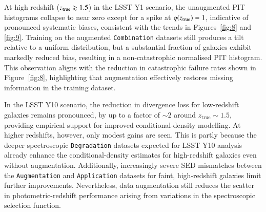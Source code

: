 At high redshift (\(z_{\rm true}\gtrsim1.5\)) in the LSST Y1 scenario, the unaugmented PIT histograms collapse to near zero except for a spike at \(q(z_{\rm true})=1\), indicative of pronounced systematic biases, consistent with the trends in Figures~\ref{fig:8} and \ref{fig:9}. Training on the augmented \texttt{Combination} datasets still produces a tilt relative to a uniform distribution, but a substantial fraction of galaxies exhibit markedly reduced bias, resulting in a non‐catastrophic normalised PIT histogram. This observation aligns with the reduction in catastrophic failure rates shown in Figure~\ref{fig:8}, highlighting that augmentation effectively restores missing information in the training dataset.

In the LSST Y10 scenario, the reduction in divergence loss for low-redshift galaxies remains pronounced, by up to a factor of \(\sim 2\) around \(z_\mathrm{true} \sim 1.5\), providing empirical support for improved conditional-density modelling. At higher redshifts, however, only modest gains are seen. This is partly because the deeper spectroscopic \texttt{Degradation} datasets expected for LSST Y10 analysis already enhance the conditional-density estimates for high-redshift galaxies even without augmentation. Additionally, increasingly severe SED mismatches between the \texttt{Augmentation} and \texttt{Application} datasets for faint, high-redshift galaxies limit further improvements. Nevertheless, data augmentation still reduces the scatter in photometric-redshift performance arising from variations in the spectroscopic selection function.

